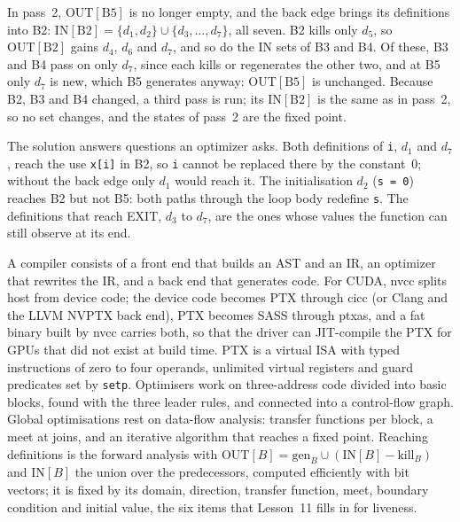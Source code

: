 \documentclass[../main.tex]{subfiles}
\begin{document}
\begin{example}
  \label{ex:l10-pass2}
  In pass~2, $\mathrm{OUT}[\mathrm{B5}]$ is no longer empty, and the
  back edge brings its definitions into B2:
  $\mathrm{IN}[\mathrm{B2}]=\{d_1,d_2\}\cup\{d_3,\dots,d_7\}$, all seven.
  B2 kills only $d_5$, so $\mathrm{OUT}[\mathrm{B2}]$ gains $d_4$, $d_6$
  and $d_7$, and so do the $\mathrm{IN}$ sets of B3 and B4.  Of these,
  B3 and B4 pass on only $d_7$, since each kills or regenerates the
  other two, and at B5 only $d_7$ is new, which B5 generates anyway:
  $\mathrm{OUT}[\mathrm{B5}]$ is unchanged.  Because B2, B3 and B4
  changed, a third pass is run; its $\mathrm{IN}[\mathrm{B2}]$ is the
  same as in pass~2, so no set changes, and the states of pass~2 are
  the fixed point.
\end{example}

The solution answers questions an optimizer asks.  Both definitions of
\texttt{i}, $d_1$ and $d_7$, reach the use \texttt{x[i]} in B2, so
\texttt{i} cannot be replaced there by the constant~0; without the back
edge only $d_1$ would reach it.  The initialisation
$d_2$ (\texttt{s = 0}) reaches B2 but not B5: both paths through the
loop body redefine \texttt{s}.  The definitions that reach EXIT,
$d_3$ to $d_7$, are the ones whose values the function can still
observe at its end.

\begin{keypoint}
  A compiler consists of a front end that builds an AST and an IR, an
  optimizer that rewrites the IR, and a back end that generates code.
  For CUDA, nvcc splits host from device code; the device code becomes
  PTX through cicc (or Clang and the LLVM NVPTX back end), PTX becomes
  SASS through ptxas, and a fat binary built by nvcc carries both, so that the driver
  can JIT-compile the PTX for GPUs that did not exist at build time.
  PTX is a virtual ISA with typed instructions of zero to four operands,
  unlimited virtual registers and guard predicates set by
  \texttt{setp}.  Optimisers work on three-address code divided into
  basic blocks, found with the three leader rules, and connected into a
  control-flow graph.  Global optimisations rest on data-flow analysis:
  transfer functions per block, a meet at joins, and an iterative
  algorithm that reaches a fixed point.  Reaching definitions is the
  forward analysis with
  $\mathrm{OUT}[B]=\mathrm{gen}_B\cup(\mathrm{IN}[B]-\mathrm{kill}_B)$
  and $\mathrm{IN}[B]$ the union over the predecessors, computed
  efficiently with bit vectors; it is fixed by its domain, direction,
  transfer function, meet, boundary condition and initial value, the
  six items that Lesson~11 fills in for liveness.
\end{keypoint}
\end{document}
